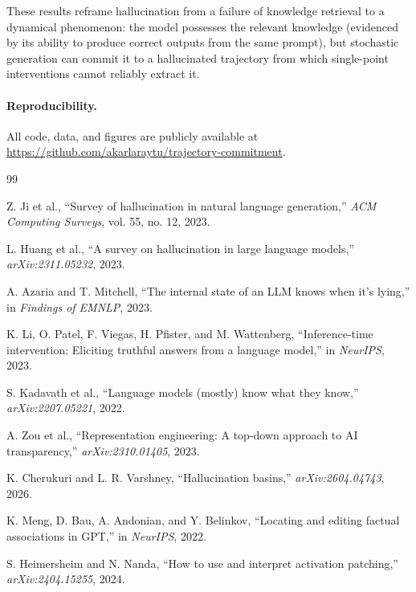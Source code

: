 \documentclass[11pt,a4paper]{article}
\begin{document}
These results reframe hallucination from a failure of knowledge retrieval to a dynamical phenomenon: the model possesses the relevant knowledge (evidenced by its ability to produce correct outputs from the same prompt), but stochastic generation can commit it to a hallucinated trajectory from which single-point interventions cannot reliably extract it.

\paragraph{Reproducibility.} All code, data, and figures are publicly available at \url{https://github.com/akarlaraytu/trajectory-commitment}.



\begingroup
\small
\setlength{\itemsep}{2pt}
\begin{thebibliography}{99}

Z. Ji et al., ``Survey of hallucination in natural language generation,'' \emph{ACM Computing Surveys}, vol. 55, no. 12, 2023.

L. Huang et al., ``A survey on hallucination in large language models,'' \emph{arXiv:2311.05232}, 2023.

A. Azaria and T. Mitchell, ``The internal state of an LLM knows when it's lying,'' in \emph{Findings of EMNLP}, 2023.

K. Li, O. Patel, F. Viegas, H. Pfister, and M. Wattenberg, ``Inference-time intervention: Eliciting truthful answers from a language model,'' in \emph{NeurIPS}, 2023.

S. Kadavath et al., ``Language models (mostly) know what they know,'' \emph{arXiv:2207.05221}, 2022.

A. Zou et al., ``Representation engineering: A top-down approach to AI transparency,'' \emph{arXiv:2310.01405}, 2023.

K. Cherukuri and L. R. Varshney, ``Hallucination basins,'' \emph{arXiv:2604.04743}, 2026.

K. Meng, D. Bau, A. Andonian, and Y. Belinkov, ``Locating and editing factual associations in GPT,'' in \emph{NeurIPS}, 2022.

S. Heimersheim and N. Nanda, ``How to use and interpret activation patching,'' \emph{arXiv:2404.15255}, 2024.


\end{thebibliography}
\end{document}

